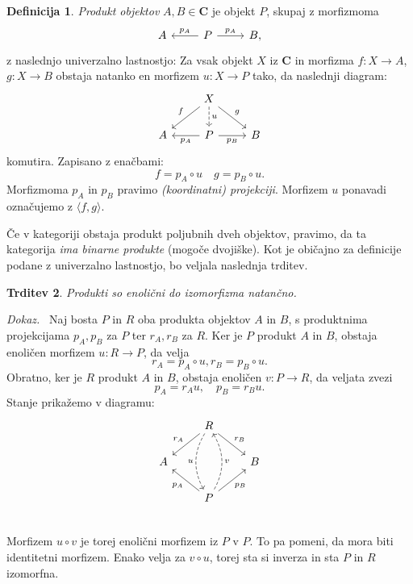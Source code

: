 \documentclass[12pt,a4paper]{book}
\theoremstyle{definition}
\newtheorem{definicija}{Definicija}[chapter]
\theoremstyle{plain}
\newtheorem{trditev}[definicija]{Trditev}
\newenvironment{dokaz}{\emph{Dokaz.}\ }{\hspace{\fill}{$\Box$}}
\theoremstyle{definition}
\theoremstyle{remark}
\newcommand{\cat}[1]{\textbf{#1}}
\begin{document}
\begin{definicija}
\emph{Produkt objektov} $A,B \in \cat{C}$ je objekt $P$, skupaj z morfizmoma
$$\begin{tikzcd}
A & P \ar[l, "p_A"'] \ar[r, "p_A"] & B,
\end{tikzcd}$$
z naslednjo univerzalno lastnostjo: Za vsak objekt $X$ iz $\cat{C}$ in morfizma $f : X \to A$, $g : X \to B$ obstaja natanko en morfizem $u : X \to P$ tako, da naslednji diagram:
%
$$\begin{tikzcd}
& X \ar[ld, "f"'] \ar[d, dashed, "u"] \ar[rd, "g"] & \\
A & P \ar[l, "p_A"] \ar[r, "p_B"'] & B
\end{tikzcd}$$
%
komutira. Zapisano z enačbami:
$$f = p_A \circ u \quad g = p_B \circ u.$$
Morfizmoma $p_A$ in $p_B$ pravimo \emph{(koordinatni) projekciji}. Morfizem $u$ ponavadi označujemo z $\langle f,g \rangle$.
\end{definicija}
%
Če v kategoriji obstaja produkt poljubnih dveh objektov, pravimo, da ta kategorija \emph{ima binarne produkte} (mogoče dvojiške).
%
Kot je običajno za definicije podane z univerzalno lastnostjo, bo veljala naslednja trditev.
%
\begin{trditev}
Produkti so enolični do izomorfizma natančno.
\end{trditev}
\begin{dokaz}
Naj bosta $P$ in $R$ oba produkta objektov $A$ in $B$, s produktnima projekcijama $p_A, p_B$ za $P$ ter $r_A, r_B$ za $R$. Ker je $P$ produkt $A$ in $B$, obstaja enoličen morfizem $u : R \to P$, da velja 
$$r_A = p_A \circ u, r_B = p_B \circ u.$$
Obratno, ker je $R$ produkt $A$ in $B$, obstaja enoličen $v : P \to R$, da veljata zvezi
$$p_A = r_Au, \quad p_B = r_Bu.$$
Stanje prikažemo v diagramu:
%
$$\begin{tikzcd}
& R \ar[dd, dashed, bend right, "u"'] \ar[dl, "r_A"'] \ar[dr, "r_B"] & \\
A & & B \\
& P \ar[uu, dashed, bend right, "v"'] \ar[ul, "p_A"] \ar[ur, "p_B"'] & \\
\end{tikzcd}$$
%
Morfizem $u \circ v $ je torej enolični morfizem iz $P$ v $P$. To pa pomeni, da mora biti identitetni morfizem. Enako velja za $v \circ u$, torej sta si inverza in sta $P$ in $R$ izomorfna.
\end{dokaz}
\end{document}

